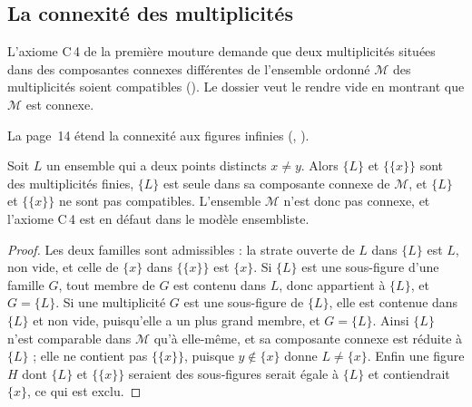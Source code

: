 \subsection*{La connexité des multiplicités}

L'axiome C\,4 de la première mouture demande que deux multiplicités situées dans des composantes connexes différentes de l'ensemble ordonné $\mathcal M$ des multiplicités soient compatibles (). Le dossier veut le rendre vide en montrant que $\mathcal M$ est connexe.

\begin{enonce}[Page 13]
 La page~14 étend la connexité aux figures infinies (, ).
\end{enonce}

\begin{encadre}
\begin{contrexemple}
Soit $L$ un ensemble qui a deux points distincts $x \neq y$. Alors $\{L\}$ et $\{\{x\}\}$ sont des multiplicités finies, $\{L\}$ est seule dans sa composante connexe de $\mathcal M$, et $\{L\}$ et $\{\{x\}\}$ ne sont pas compatibles. L'ensemble $\mathcal M$ n'est donc pas connexe, et l'axiome C\,4 est en défaut dans le modèle ensembliste.
\end{contrexemple}
\end{encadre}

\begin{proof}
Les deux familles sont admissibles : la strate ouverte de $L$ dans $\{L\}$ est $L$, non vide, et celle de $\{x\}$ dans $\{\{x\}\}$ est $\{x\}$. Si $\{L\}$ est une sous-figure d'une famille $G$, tout membre de $G$ est contenu dans $L$, donc appartient à $\{L\}$, et $G = \{L\}$. Si une multiplicité $G$ est une sous-figure de $\{L\}$, elle est contenue dans $\{L\}$ et non vide, puisqu'elle a un plus grand membre, et $G = \{L\}$. Ainsi $\{L\}$ n'est comparable dans $\mathcal M$ qu'à elle-même, et sa composante connexe est réduite à $\{L\}$ ; elle ne contient pas $\{\{x\}\}$, puisque $y \notin \{x\}$ donne $L \neq \{x\}$. Enfin une figure $H$ dont $\{L\}$ et $\{\{x\}\}$ seraient des sous-figures serait égale à $\{L\}$ et contiendrait $\{x\}$, ce qui est exclu.
\end{proof}

